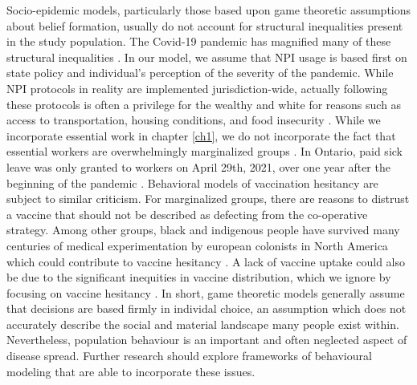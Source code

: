 Socio-epidemic models, particularly those based upon game theoretic assumptions about belief formation, usually do not account for structural inequalities present in the study population. The Covid-19 pandemic has magnified many of these structural inequalities \cite{yaya2020ethnic,chen2021revealing,chen2020covid,bowleg2020we,tuyisenge2021covid}. In our model, we assume that NPI usage is based first on state policy and individual's perception of the severity of the pandemic. While NPI protocols in reality are implemented jurisdiction-wide, actually following these protocols is often a privilege for the wealthy and white for reasons such as access to transportation, housing conditions, and food insecurity \cite{jay2020neighbourhood,mamelund2021social}. While we incorporate essential work in chapter \ref{ch1}, we do not incorporate the fact that essential workers are overwhelmingly marginalized groups \cite{lancet2020plight}. In Ontario, paid sick leave was only granted to workers on April 29th, 2021, over one year after the beginning of the pandemic \cite{ontariosickleave}. Behavioral models of vaccination hesitancy are subject to similar criticism. For marginalized groups, there are reasons to distrust a vaccine that should not be described as defecting from the co-operative strategy. Among other groups, black and indigenous people have survived many centuries of medical experimentation by european colonists in North America \cite{pacheco2013moving,washington2006medical} which could contribute to vaccine hesitancy \cite{jamison2019you,bogart2021covid}. A lack of vaccine uptake could also be due to the significant inequities in vaccine distribution, which we ignore by focusing on vaccine hesitancy \cite{iveniuk2021uneven,osama2021covid,corbie2021vaccine}. In short, game theoretic models generally assume that decisions are based firmly in individal choice, an assumption which does not accurately describe the social and material landscape many people exist within. Nevertheless, population behaviour is an important and often neglected aspect of disease spread. Further research should explore frameworks of behavioural modeling that are able to incorporate these issues. 

